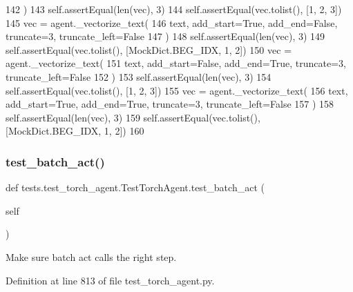 \begin{DoxyCode}
142         )
143         self.assertEqual(len(vec), 3)
144         self.assertEqual(vec.tolist(), [1, 2, 3])
145         vec = agent.\_vectorize\_text(
146             text, add\_start=\textcolor{keyword}{True}, add\_end=\textcolor{keyword}{False}, truncate=3, truncate\_left=\textcolor{keyword}{False}
147         )
148         self.assertEqual(len(vec), 3)
149         self.assertEqual(vec.tolist(), [MockDict.BEG\_IDX, 1, 2])
150         vec = agent.\_vectorize\_text(
151             text, add\_start=\textcolor{keyword}{False}, add\_end=\textcolor{keyword}{True}, truncate=3, truncate\_left=\textcolor{keyword}{False}
152         )
153         self.assertEqual(len(vec), 3)
154         self.assertEqual(vec.tolist(), [1, 2, 3])
155         vec = agent.\_vectorize\_text(
156             text, add\_start=\textcolor{keyword}{True}, add\_end=\textcolor{keyword}{True}, truncate=3, truncate\_left=\textcolor{keyword}{False}
157         )
158         self.assertEqual(len(vec), 3)
159         self.assertEqual(vec.tolist(), [MockDict.BEG\_IDX, 1, 2])
160 
\end{DoxyCode}
\mbox{\label{classtests_1_1test__torch__agent_1_1TestTorchAgent_aed82743e884c933453d912cfa8c7ec7f}} 
\subsubsection{\texorpdfstring{test\+\_\+batch\+\_\+act()}{test\_batch\_act()}}
{\footnotesize\ttfamily def tests.\+test\+\_\+torch\+\_\+agent.\+Test\+Torch\+Agent.\+test\+\_\+batch\+\_\+act (\begin{DoxyParamCaption}\item[{}]{self }\end{DoxyParamCaption})}

\begin{DoxyVerb}Make sure batch act calls the right step.
\end{DoxyVerb}
 

Definition at line 813 of file test\+\_\+torch\+\_\+agent.\+py.


